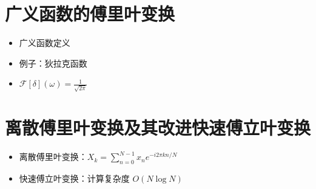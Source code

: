 \documentclass[12pt,a4paper]{article}
\begin{document}
	\section{广义函数的傅里叶变换}
	\begin{itemize}
		\item 广义函数定义
		\item 例子：狄拉克函数
		\item \(\mathcal{F}[\delta](\omega) = \frac{1}{\sqrt{2\pi}}\)
	\end{itemize}
	
	\section{离散傅里叶变换及其改进快速傅立叶变换}
	\begin{itemize}
		\item 离散傅里叶变换：\(X_k = \sum_{n=0}^{N-1} x_n e^{-i2\pi kn/N}\)
		\item 快速傅立叶变换：计算复杂度 \(O(N \log N)\)
	\end{itemize}
	
\end{document}
